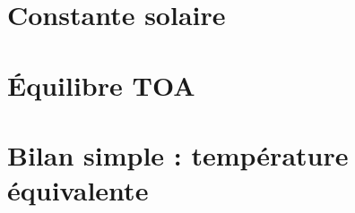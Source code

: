 \documentclass[a4paper,DIV16,10pt]{scrartcl}
\begin{document}
 \inidoc

%
%
%
%
%
%
%
%
%
%
%
\newpage \section{Constante solaire}  


\newpage \section{\'Equilibre TOA} 

\newpage \section{Bilan simple : température équivalente}  
\end{document}
